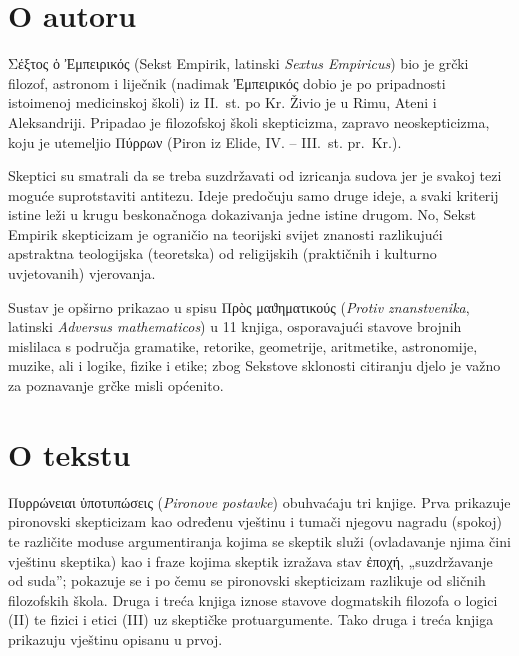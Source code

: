 
\section*{O autoru}

Σέξτος ὁ Ἐμπειρικός (Sekst Empirik, latinski \textit{Sextus Empiricus}) bio je grčki filozof, astronom i liječnik (nadimak Ἐμπειρικός dobio je po pripadnosti istoimenoj medicinskoj školi) iz II.~st. po Kr. Živio je u Rimu, Ateni i Aleksandriji. Pripadao je filozofskoj školi skepticizma, zapravo neoskepticizma, koju je utemeljio \textgreek[variant=ancient]{Πύρρων} (Piron iz Elide, IV. – III.~st. pr.~Kr.). 

Skeptici su smatrali da se treba suzdržavati od izricanja sudova jer je svakoj tezi moguće suprotstaviti antitezu. Ideje predočuju samo druge ideje, a svaki kriterij istine leži u krugu beskonačnoga dokazivanja jedne istine drugom. No, Sekst Empirik skepticizam je ograničio na teorijski svijet znanosti razlikujući apstraktna teologijska (teoretska) od religijskih (praktičnih i kulturno uvjetovanih) vjerovanja. 

Sustav je opširno prikazao u spisu \textgreek[variant=ancient]{Πρὸς μαϑηματικούς} (\textit{Protiv znanstvenika}, latinski \textit{Adversus mathematicos}) u 11 knjiga, osporavajući stavove brojnih mislilaca s područja gramatike, retorike, geometrije, aritmetike, astronomije, muzike, ali i logike, fizike i etike; zbog Sekstove sklonosti citiranju djelo je važno za poznavanje grčke misli općenito.

\section*{O tekstu}

\textgreek[variant=ancient]{Πυρρώνειαι ὑποτυπώσεις} (\textit{Pironove postavke}) obuhvaćaju tri knjige. Prva prikazuje pironovski skepticizam kao određenu vještinu i tumači njegovu nagradu (spokoj) te različite moduse argumentiranja kojima se skeptik služi (ovladavanje njima čini vještinu skeptika) kao i fraze kojima skeptik izražava stav ἐποχή, „suzdržavanje od suda”; pokazuje se i po čemu se pironovski skepticizam razlikuje od sličnih filozofskih škola. Druga i treća knjiga iznose stavove dogmatskih filozofa o logici (II) te fizici i etici (III) uz skeptičke protuargumente. Tako druga i treća knjiga prikazuju vještinu opisanu u prvoj.

